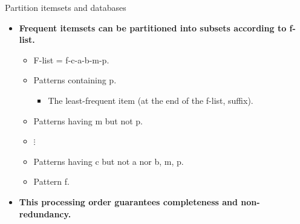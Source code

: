 \documentclass[aspectratio=169,t,xcolor=dvipsnames]{beamer}
\begin{document}
  {
    \begin{frame}{Partition itemsets and databases}
    \begin{itemize}
      \item \textbf{Frequent itemsets can be partitioned into subsets according to f-list.}
      \begin{itemize}
        \item F-list = f-c-a-b-m-p.
        \item Patterns containing p.
        \begin{itemize}
          \item The least-frequent item (at the end of the f-list, suffix).
        \end{itemize}
        \item Patterns having m but not p.
        \item $\vdots$
        \item Patterns having c but not a nor b, m, p.
        \item Pattern f.
      \end{itemize}
      \item \textbf{This processing order guarantees completeness and non-redundancy.}
    \end{itemize}
    \end{frame}
  }
\end{document}
